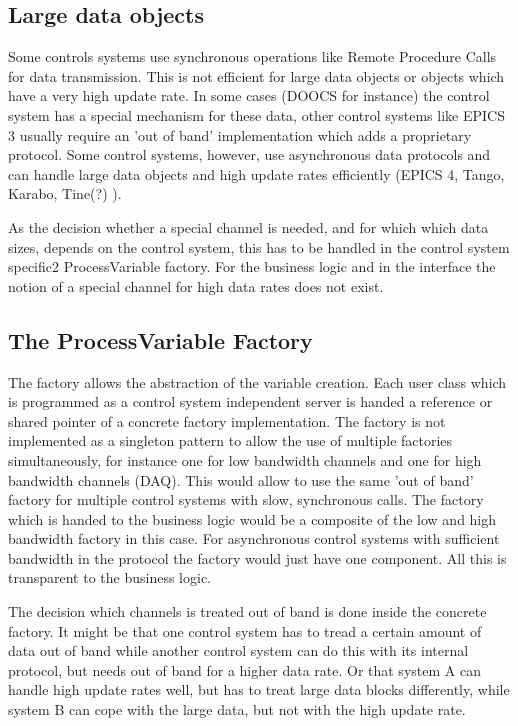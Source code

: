 \documentclass[11pt,a4paper]{scrartcl}
\begin{document}
\subsection{Large data objects}

Some controls systems use synchronous operations like Remote Procedure Calls
for data transmission. This is not efficient for large data objects or objects
which have a very high update rate. In some cases (DOOCS for instance) the
control system has a special mechanism for these data, other control systems
like EPICS 3 usually require an 'out of band' implementation which adds a
proprietary protocol. Some control systems, however, use asynchronous data
protocols and can handle large data objects and high update rates efficiently
(EPICS 4, Tango, Karabo, Tine(?) ).

As the decision whether a special channel is needed, and for which which data sizes, depends on
the control system, this has to be handled in the control system specific2
ProcessVariable factory. For the business logic and in the interface the
notion of a special channel for high data rates does not exist.

\subsection{The ProcessVariable Factory}

The factory allows the abstraction of the variable creation. Each user class
which is programmed as a control system independent server is handed a
reference or shared pointer of a concrete factory implementation. The factory
is not implemented as a singleton pattern to allow the use of multiple
factories simultaneously, for instance one for low bandwidth channels and one
for high bandwidth channels (DAQ). This would allow to use the same 'out of
band' factory for multiple control systems with slow, synchronous calls. The
factory which is handed to the business logic would be a composite of the low
and high bandwidth factory in this case. 
For asynchronous control systems with sufficient bandwidth in the protocol the
factory would just have one component. All this is transparent to the business
logic.

The decision which channels is treated out of band is done inside the concrete
factory. It might be that one control system has to tread a certain amount of
data out of band while another control system can do this with its internal
protocol, but needs out of band for a higher data rate. Or that system A can
handle high update rates well, but has to treat large data blocks differently,
while system B can cope with the large data, but not with the high update
rate.
\end{document}
